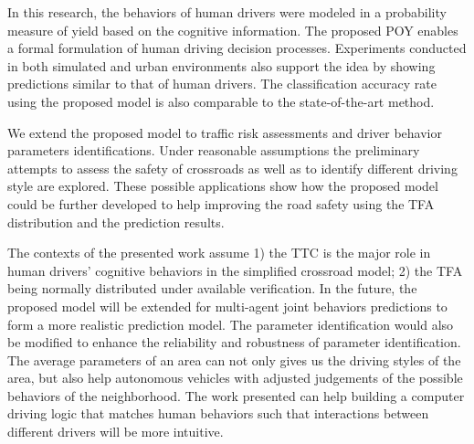 


In this research, the behaviors of human drivers were modeled in a probability measure of yield based on the cognitive information. The proposed POY enables a formal formulation of human driving decision processes. Experiments conducted in both simulated and urban environments also support the idea by showing predictions similar to that of human drivers. The classification accuracy rate using the proposed model is also comparable to the state-of-the-art method.

We extend the proposed model to traffic risk assessments and driver behavior parameters identifications. Under reasonable assumptions the preliminary attempts to assess the safety of crossroads as well as to identify different driving style are explored. These possible applications show how the proposed model could be further developed to help improving the road safety using the TFA distribution and the prediction results.

The contexts of the presented work assume 1) the TTC is the major role in human drivers' cognitive behaviors in the simplified crossroad model; 2) the TFA being normally distributed under available verification. In the future, the proposed model will be extended for multi-agent joint behaviors predictions to form a more realistic prediction model. The parameter identification would also be modified to enhance the reliability and robustness of parameter identification. The average parameters of an area can not only gives us the driving styles of the area, but also help autonomous vehicles with adjusted judgements of the possible behaviors of the neighborhood. The work presented can help building a computer driving logic that matches human behaviors such that interactions between different drivers will be more intuitive.